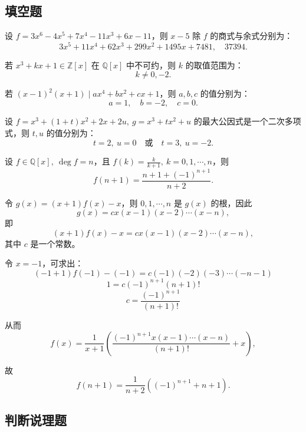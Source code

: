 \documentclass[lang=cn,12pt]{elegantbook}
\begin{document}
\subsection{填空题}

\begin{example}
    设 \( f = 3x^6 - 4x^5 + 7x^4 - 11x^3 + 6x - 11 \)，则 \( x - 5 \) 除 \( f \) 的商式与余式分别为：
    \[
    3x^5 + 11x^4 + 62x^3 + 299x^2 + 1495x + 7481,\quad 37394.
    \]
\end{example}

\begin{example}
    若 \( x^3 + kx + 1 \in \mathbb{Z}[x] \) 在 \( \mathbb{Q}[x] \) 中不可约，则 \( k \) 的取值范围为：
    \[
    k \neq 0, -2.
    \]
\end{example}

\begin{example}
    若 \( (x-1)^2(x+1) \mid ax^4 + bx^2 + cx + 1 \)，则 \( a, b, c \) 的值分别为：
    \[
    a = 1,\quad b = -2,\quad c = 0.
    \]
\end{example}

\begin{example}
    设 \( f = x^3 + (1+t)x^2 + 2x + 2u,\ g = x^3 + tx^2 + u \) 的最大公因式是一个二次多项式，则 \( t, u \) 的值分别为：
    \[
    t = 2,\ u = 0 \quad \text{或} \quad t = 3,\ u = -2.
    \]
\end{example}
     
\begin{example}
    设 \( f \in \mathbb{Q}[x],\ \deg f = n \)，且 \( f(k) = \frac{k}{k+1},\ k = 0, 1, \cdots, n \)，则
    \[
    f(n+1) = \frac{n+1+(-1)^{n+1}}{n+2}.
    \]
\end{example}

\begin{solution}
令 \( g(x) = (x+1)f(x) - x \)，则 \( 0,1,\cdots,n \) 是 \( g(x) \) 的根，因此
\[
g(x) = cx(x-1)(x-2)\cdots(x-n),
\]
即
\[
(x+1)f(x) - x = cx(x-1)(x-2)\cdots(x-n),
\]
其中 \( c \) 是一个常数。

令 \( x = -1 \)，可求出：
\[
(-1+1)f(-1) - (-1) = c(-1)(-2)(-3)\cdots(-n-1)
\]
\[
1 = c(-1)^{n+1}(n+1)!
\]
\[
c = \frac{(-1)^{n+1}}{(n+1)!}
\]

从而
\[
f(x) = \frac{1}{x+1}\left(\frac{(-1)^{n+1}x(x-1)\cdots(x-n)}{(n+1)!}+x\right),
\]

故
\[
f(n+1) = \frac{1}{n+2}\left((-1)^{n+1}+n+1\right).
\]

\end{solution}

\subsection{判断说理题}
\end{document}
